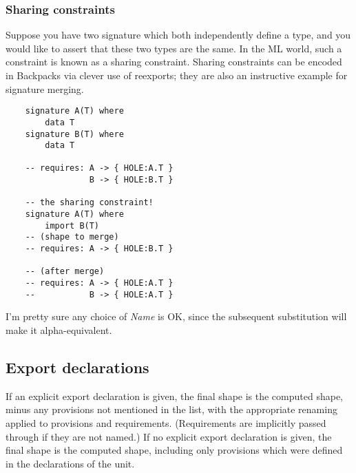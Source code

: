 \documentclass{article}
\newcommand{\Red}[1]{{\color{red} #1}}
\begin{document}
\subsubsection{Sharing constraints}

Suppose you have two signature which both independently define a type,
and you would like to assert that these two types are the same.  In the
ML world, such a constraint is known as a sharing constraint.  Sharing
constraints can be encoded in Backpacks via clever use of reexports;
they are also an instructive example for signature merging.

\begin{verbatim}
    signature A(T) where
        data T
    signature B(T) where
        data T

    -- requires: A -> { HOLE:A.T }
                 B -> { HOLE:B.T }

    -- the sharing constraint!
    signature A(T) where
        import B(T)
    -- (shape to merge)
    -- requires: A -> { HOLE:B.T }

    -- (after merge)
    -- requires: A -> { HOLE:A.T }
    --           B -> { HOLE:A.T }
\end{verbatim}
%
\Red{I'm pretty sure any choice of \textit{Name} is OK, since the
subsequent substitution will make it alpha-equivalent.}

\subsection{Export declarations}

If an explicit export declaration is given, the final shape is the
computed shape, minus any provisions not mentioned in the list, with the
appropriate renaming applied to provisions and requirements.  (Requirements
are implicitly passed through if they are not named.)
If no explicit export declaration is given, the final shape is
the computed shape, including only provisions which were defined
in the declarations of the unit.
\end{document}
